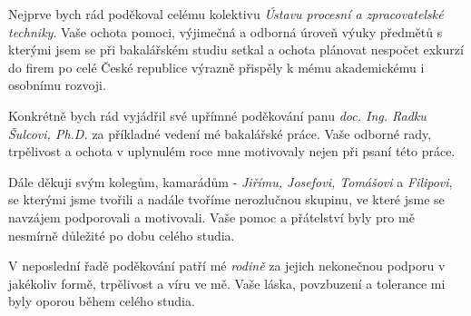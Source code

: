 \newpage
\thispagestyle{empty}
\phantom{.}
\newpage
\thispagestyle{empty}
	\vspace*{\fill}
        \noindent
        {{\LARGE\selectfont{Poděkování}}\par}
        \vspace*{2\baselineskip}

Nejprve bych rád poděkoval celému kolektivu \textit{Ústavu procesní a zpracovatelské techniky}. Vaše ochota pomoci, výjimečná a odborná úroveň výuky předmětů s kterými jsem se při bakalářském studiu setkal a ochota plánovat nespočet exkurzí do firem po celé České republice výrazně přispěly k mému akademickému i osobnímu rozvoji.

\noindent
Konkrétně bych rád vyjádřil své upřímné poděkování panu \textit{doc. Ing. Radku Šulcovi, Ph.D.} za příkladné vedení mé bakalářské práce. Vaše odborné rady, trpělivost a ochota v uplynulém roce mne motivovaly nejen při psaní této práce.
\vspace*{4mm}

\noindent
Dále děkuji svým kolegům, kamarádům - \textit{Jiřímu, Josefovi, Tomášovi} a \textit{Filipovi}, se kterými jsme tvořili a nadále tvoříme nerozlučnou skupinu, ve které jsme se navzájem podporovali a motivovali. Vaše pomoc a přátelství byly pro mě nesmírně důležité po dobu celého studia.
\vspace*{4mm}

\noindent
V neposlední řadě poděkování patří mé \textit{rodině} za jejich nekonečnou podporu v jakékoliv formě, trpělivost a víru ve mě. Vaše láska, povzbuzení a tolerance mi byly oporou během celého studia.